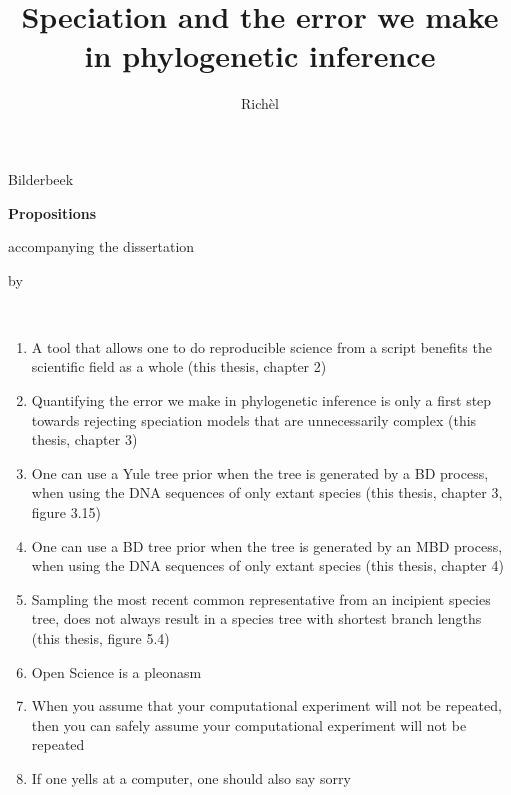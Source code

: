 \documentclass{propositions}
\begin{document}
\title{Speciation and the error we make in phylogenetic inference}
\author{Richèl}{Bilderbeek}

\begin{center}

{\Large\titlefont\bfseries Propositions}

\bigskip

accompanying the dissertation

\bigskip

{\makeatletter
\titlestyle\bfseries\large\@title
\makeatother}

{\makeatletter
\ifx\@subtitle\undefined\else
    \titlefont\titleshape\@subtitle
\fi
\makeatother}

\bigskip

by

\bigskip

\makeatletter
{\large\titlefont\bfseries\@firstname\ {\titleshape\@lastname}}
\makeatother

\end{center}

\bigskip
\bigskip

\begin{enumerate}
  \item A tool that allows one to do reproducible science from a script
        benefits the scientific field as a whole (this thesis, chapter 2)
  \item Quantifying the error we make in phylogenetic inference is
        only a first step towards rejecting speciation models that are
        unnecessarily complex (this thesis, chapter 3)
  \item One can use a Yule tree prior when the tree
        is generated by a BD process, when using the DNA sequences
        of only extant species (this thesis, chapter 3, figure 3.15)
  \item One can use a BD tree prior when the tree
        is generated by an MBD process, when using the DNA sequences
        of only extant species (this thesis, chapter 4)
  \item Sampling the most recent common representative from an incipient
        species tree, does not always result in a species tree with shortest
        branch lengths (this thesis, figure 5.4)
  \item Open Science is a pleonasm
  \item When you assume that your computational experiment will not be repeated,
        then you can safely assume your computational experiment will not be repeated
  \item If one yells at a computer, one should also say sorry
\end{enumerate}
\end{document}
